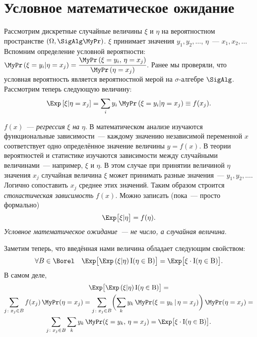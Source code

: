 \section{Условное математическое ожидание}
    Рассмотрим дискретные случайные величины $\xi$ и $\eta$ на вероятностном пространстве $(\Omega, \SigAlg \MyPr)$. 
    $\xi$ принимает значения $y_1, y_2, \ldots$, $\eta$~--- $x_1, x_2, \ldots$
    Вспомним определение условной вероятности: ${\MyPr\left( \xi = y_i | \eta = x_j \right) = \cfrac{\MyPr\left( \xi = y_i, \, \eta = x_j\right)}{\MyPr\left(\eta = x_j\right)}}$.
    Ранее мы проверяли, что условная вероятность является вероятностной мерой на $\sigma$-алгебре $\SigAlg$.
    Рассмотрим теперь следующую величину:
    \begin{equation}
        \Exp \left[ \xi | \eta = x_j \right] = 
        \sum\limits_i y_i \, \MyPr\left(\xi = y_i | \eta = x_j \right) \equiv
        f(x_j).
        \label{cond_exp:discrete}
    \end{equation}
    
    $f(x)$~--- \textit{регрессия} $\xi$ \textit{на} $\eta$. 
    В математическом анализе изучаются функциональные зависимости~--- каждому значению независимой переменной $x$ соответствует одно определённое значение величины $y = f(x)$.
    В теории вероятностей и статистике изучаются зависимости между случайными величинами~--- например, $\xi$ и $\eta$.
    В этом случае при принятии величиной $\eta$ значения $x_j$ случайная величина $\xi$ может принимать разные значения~--- $y_1, y_2, \ldots$.
    Логично сопоставить $x_j$ среднее этих значений.
    Таким образом строится \textit{стохастическая зависимость} $f(x)$.
    Можно записать (пока~--- просто формально)
    \begin{equation*}
        \Exp \bigl[\xi | \eta \bigr] = f(\eta).
    \end{equation*}
    \textit{Условное математическое ожидание~--- не число, а случайная величина}.
    
    Заметим теперь, что введённая нами величина обладает следующим свойством:
    \begin{equation*}
        \forall B \in \Borel \quad \Exp \bigl[ \Exp \left( \xi | \eta\right) \rm{I}(\eta \in B)\bigr] = 
        \Exp \bigl[ \xi \cdot \rm{I}(\eta \in B) \bigr].
    \end{equation*}
    В самом деле,
    \begin{gather*}
        \Exp \bigl[ \Exp \left( \xi | \eta\right) \rm{I}(\eta \in B)\bigr] = \\
        \sum\limits_{j \colon x_j \in B} f(x_j) \, \MyPr(\eta = x_j) = 
        \sum\limits_{j \colon x_j \in B} \biggl( \sum\limits_k y_k \, \MyPr(\xi = y_k \,|\, \eta = x_j) \biggr) \, \MyPr(\eta = x_j) = \\
        \sum\limits_{j \colon x_j \in B} \sum\limits_k y_k \, \MyPr(\xi = y_k, \, \eta = x_j) = 
        \Exp \bigl[ \xi \cdot \rm{I}(\eta \in B)\bigr].
    \end{gather*}

